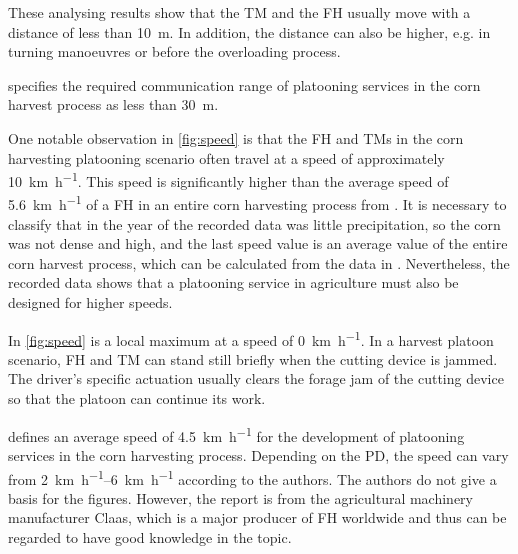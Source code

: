 These analysing results show that the \ac{TM} and the \ac{FH} usually move with a distance of less than \SI{10}{\metre}.
In addition, the distance can also be higher, e.g. in turning manoeuvres or before the overloading process.

\textcite{smolnik_5g_2020} specifies the required communication range of platooning services in the corn harvest process
as less than \SI{30}{\metre}.

One notable observation in \autoref{fig:speed} is that the \ac{FH} and \ac{TM}s in the corn harvesting platooning scenario
often travel at a speed of approximately \SI{10}{\kilo\metre\per\hour}.
This speed is significantly higher than the average speed of \SI{5.6}{\kilo\metre\per\hour} of a \ac{FH} in an entire
corn harvesting process from \cite{faustzahlen2018}.
It is necessary to classify that in the year of the recorded data was little precipitation, so the corn was not dense and high,
and the last speed value is an average value of the entire corn harvest process,
which can be calculated from the data in \cite{faustzahlen2018}.
Nevertheless, the recorded data shows that a platooning service in agriculture must also be designed for higher speeds. 

In \autoref{fig:speed} is a local maximum at a speed of \SI{0}{\kilo\metre\per\hour}.
In a harvest platoon scenario, \ac{FH} and \ac{TM} can stand still briefly when the cutting device is jammed.
The driver's specific actuation usually clears the forage jam of the cutting device so that the platoon can continue its work.

\textcite{smolnik_5g_2020} defines an average speed of \SI{4.5}{\kilo\metre\per\hour} for the development of platooning
services in the corn harvesting process.
Depending on the \ac{PD}, the speed can vary from \SIrange{2}{6}{\kilo\metre\per\hour} according to the authors.
The authors do not give a basis for the figures.
However, the report is from the agricultural machinery manufacturer Claas,
which is a major producer of \ac{FH} worldwide and thus can be regarded to have good knowledge in the topic.

